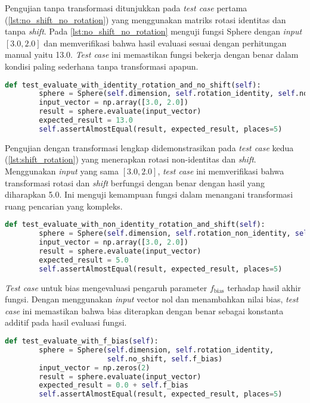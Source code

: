 Pengujian tanpa transformasi ditunjukkan pada \textit{test case} pertama (\cref{lst:no_shift_no_rotation}) yang menggunakan matriks rotasi identitas dan tanpa \textit{shift}. Pada \cref{lst:no_shift_no_rotation} menguji fungsi Sphere dengan \textit{input} $[3.0, 2.0]$ dan memverifikasi bahwa hasil evaluasi sesuai dengan perhitungan manual yaitu 13.0. \textit{Test case} ini memastikan fungsi bekerja dengan benar dalam kondisi paling sederhana tanpa transformasi apapun.
\begin{lstlisting}[language=Python, caption=\textit{Test case} tanpa rotasi dan \textit{shift}, label=lst:no_shift_no_rotation]
    def test_evaluate_with_identity_rotation_and_no_shift(self):
        sphere = Sphere(self.dimension, self.rotation_identity, self.no_shift)
        input_vector = np.array([3.0, 2.0])
        result = sphere.evaluate(input_vector)
        expected_result = 13.0
        self.assertAlmostEqual(result, expected_result, places=5)
\end{lstlisting}
Pengujian dengan transformasi lengkap didemonstrasikan pada \textit{test case} kedua (\cref{lst:shift_rotation}) yang menerapkan rotasi non-identitas dan \textit{shift}. Menggunakan \textit{input} yang sama $[3.0, 2.0]$, \textit{test case} ini memverifikasi bahwa transformasi rotasi dan \textit{shift} berfungsi dengan benar dengan hasil yang diharapkan 5.0. Ini menguji kemampuan fungsi dalam menangani transformasi ruang pencarian yang kompleks.
\begin{lstlisting}[language=Python, caption=\textit{Test case} dengan rotasi dan \textit{shift}, label=lst:shift_rotation]
    def test_evaluate_with_non_identity_rotation_and_shift(self):
        sphere = Sphere(self.dimension, self.rotation_non_identity, self.shift)
        input_vector = np.array([3.0, 2.0])
        result = sphere.evaluate(input_vector)
        expected_result = 5.0
        self.assertAlmostEqual(result, expected_result, places=5)
\end{lstlisting}
\textit{Test case} untuk bias mengevaluasi pengaruh parameter $f_{\text{bias}}$ terhadap hasil akhir fungsi. Dengan menggunakan \textit{input} vector nol dan menambahkan nilai bias, \textit{test case} ini memastikan bahwa bias diterapkan dengan benar sebagai konstanta additif pada hasil evaluasi fungsi.
\begin{lstlisting}[language=Python, caption=\textit{Test case} dengan \textit{bias}, label=lst:bias]
    def test_evaluate_with_f_bias(self):
        sphere = Sphere(self.dimension, self.rotation_identity,
                        self.no_shift, self.f_bias)
        input_vector = np.zeros(2)
        result = sphere.evaluate(input_vector)
        expected_result = 0.0 + self.f_bias
        self.assertAlmostEqual(result, expected_result, places=5)
\end{lstlisting}

